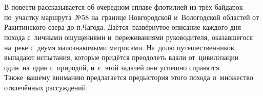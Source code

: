 \chapter*{}
В повести рассказывается об очередном сплаве флотилией из трёх байдарок по~участку маршрута~№58 \cite{Рыжавский1,Рыжавский2} на~границе Новгородской и~Вологодской областей от Ракитинского озера до п.\thinspace Чагода. Даётся~развёрнутое описание каждого дня похода с~личными ощущениями и~переживаниями руководителя, оказавшегося на~реке с~двумя малознакомыми матросами. На~долю путешественников выпадают испытания, которые придётся преодолеть вдали от~цивилизации один~на~один с~природой, и~с~этой задачей они успешно справятся. Также~вашему вниманию предлагается предыстория этого похода и~множество отвлечённых рассуждений.

